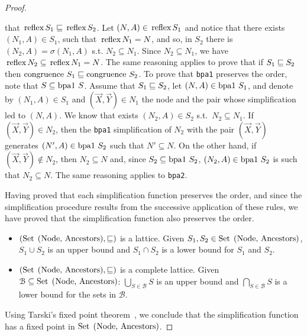 \begin{proof}
\begin{itemize}
        that
        $\text{\lstinline{reflex}}
        S_1\leqSets\text{\lstinline{reflex}}S_2$.
	Let $(N,A)\in \text{\lstinline{reflex}} S_1$ and notice that
        there exists $(N_1,A)\in S_1$, such that
        $\text{\lstinline{reflex}} N_1 = N $, and so, in $S_2$ there
        is $(N_2,A)=\sigma(N_1,A)$ s.t. $N_2\subseteq N_1$.  Since
        $N_2\subseteq N_1$, we have
        $\text{\lstinline{reflex}} N_2 \subseteq
        \text{\lstinline{reflex}} N_1 = N$.  The same reasoning
        applies to prove that if $S_1\sqsubseteq S_2$ then
        $\text{\lstinline{congruence} }
        S_1\leqSets\text{\lstinline{congruence} }S_2$.
%
	To prove that \lstinline{bpa1} preserves the order,
	note that 
	$S \subseteq \text{\lstinline{bpa1} }S$. Assume that 
	$S_1\sqsubseteq S_2$, let $(N,A)\in \text{\lstinline{bpa1} }S_1$, 
	and denote by $(N_1,A)\in S_1$ and $(\vec X,\vec Y)\in N_1$  
	the node and the pair whose simplification 
	led to $(N,A)$. We know that exists $(N_2,A)\in S_2$
	s.t.\ $N_2 \subseteq N_1$. If $(\vec X,\vec Y)\in N_2$,
	then the \lstinline{bpa1} simplification of $N_2$ with
	the pair $(\vec X,\vec Y)$ generates 
	$(N',A)\in \text{\lstinline{bpa1} }S_2$ such that 
	$N'\subseteq N$. On the other hand, if 
	$(\vec X,\vec Y)\not \in N_2$, then $N_2\subseteq N$ 
	and, since  $S_2 \subseteq \text{\lstinline{bpa1} }S_2$,
	$(N_2,A)\in \text{\lstinline{bpa1} }S_2$ is such that
	$N_2\subseteq N$.
	The same reasoning applies to \lstinline{bpa2}. 
      \end{itemize}
      
      Having proved that each simplification function preserves the
      order, and since the simplification procedure results from the
      successive application of these rules, we have proved that the
      simplification function also preserves the order.\smallskip
      \begin{itemize}
      \item $(\text{\lstinline{Set (Node, Ancestors)}}, \leqSets)$ is
        a lattice. Given
        $S_1, S_2\in \text{\lstinline{Set (Node, Ancestors)}}$,
        $S_1 \cup S_2$ is an upper bound and $S_1 \cap S_2$ is a lower
        bound for $S_1$ and $S_2$.
      \item $(\text{\lstinline{Set (Node, Ancestors)}}, \leqSets)$ is
        a complete lattice. Given
      $\mathcal{B}\subseteq \text{\lstinline{Set (Node, Ancestors)}}$:
      $\bigcup_{S\in \mathcal{B}} S$ is an upper bound and
      $\bigcap_{S\in \mathcal{B}} S$ is a lower bound for the sets in
      $\mathcal{B}$.
    \end{itemize}
    Using Tarski's fixed point theorem~\cite{tarski1955lattice}, we
    conclude that the simplification function has a fixed point in
    $\text{\lstinline{Set (Node, Ancestors)}}$.
\end{proof}

